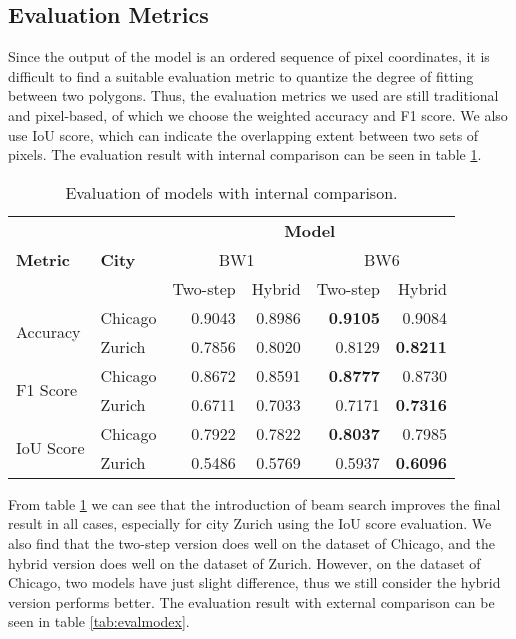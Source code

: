 \subsection{Evaluation Metrics}\label{evalmtc}
Since the output of the model is an ordered sequence of pixel coordinates, it is difficult to find a suitable evaluation metric to quantize the degree of fitting between two polygons. Thus, the evaluation metrics we used are still traditional and pixel-based, of which we choose the weighted accuracy and F1 score. We also use IoU score, which can indicate the overlapping extent between two sets of pixels. The evaluation result with internal comparison can be seen in table \ref{tab:evalmodin}.

\begin{table}[!h]
	\centering
	\caption[Evaluation of models with internal comparison]{Evaluation of models with internal comparison.}
	\label{tab:evalmodin}
	\begin{tabular}{l|l|r|r|r|r}
	\hline
	\multirow{3}{*}{\textbf{Metric}} & \multirow{3}{*}{\textbf{City}} & \multicolumn{4}{c}{\textbf{Model}} \\ \cline{3-6}
	& & \multicolumn{2}{c|}{BW1\footnotemark[1]} & \multicolumn{2}{c}{BW6\footnotemark[1]} \\ \cline{3-6}
	& & Two-step & Hybrid & Two-step & Hybrid \\ \hline
	\multirow{2}{*}{Accuracy} & Chicago & 0.9043 & 0.8986 & \textbf{0.9105} & 0.9084 \\ \cline{2-6}
	& Zurich & 0.7856 & 0.8020 & 0.8129 & \textbf{0.8211} \\ \hline
	\multirow{2}{*}{F1 Score} & Chicago & 0.8672 & 0.8591 & \textbf{0.8777} & 0.8730 \\ \cline{2-6}
	& Zurich & 0.6711 & 0.7033 & 0.7171 & \textbf{0.7316} \\ \hline
	\multirow{2}{*}{IoU Score} & Chicago & 0.7922 & 0.7822 & \textbf{0.8037} & 0.7985 \\ \cline{2-6}
	& Zurich & 0.5486 & 0.5769 & 0.5937 & \textbf{0.6096} \\
	\hline
\end{tabular}
\end{table}

From table \ref{tab:evalmodin} we can see that the introduction of beam search improves the final result in all cases, especially for city Zurich using the IoU score evaluation. We also find that the two-step version does well on the dataset of Chicago, and the hybrid version does well on the dataset of Zurich. However, on the dataset of Chicago, two models have just slight difference, thus we still consider the hybrid version performs better. The evaluation result with external comparison can be seen in table \ref{tab:evalmodex}.


